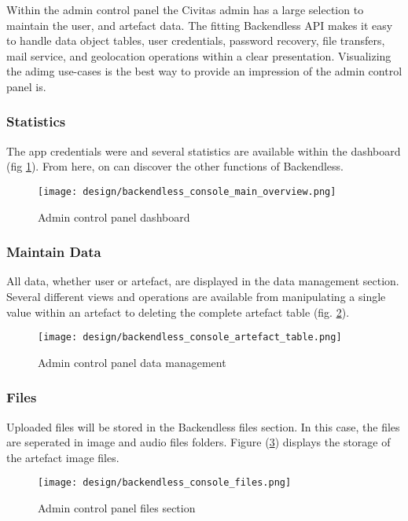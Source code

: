 Within the admin control panel the Civitas admin has a large selection to maintain the user, and artefact data. The fitting Backendless API makes it easy to handle data object tables, user credentials, password recovery, file transfers, mail service, and geolocation operations within a clear presentation. Visualizing the adimg use-cases is the best way to provide an impression of the admin control panel is.

\subsubsection*{Statistics}
The app credentials were and several statistics are available within the dashboard (fig \ref{fig:backendless_console_main_overview}). From here, on can discover the other functions of Backendless.

\begin{figure}[H]
	\centering \texttt{[image: design/backendless\_console\_main\_overview.png]}
	\caption{Admin control panel dashboard}
	\label{fig:backendless_console_main_overview}
\end{figure}


\subsubsection*{Maintain Data}
All data, whether user or artefact, are displayed in the data management section. Several different views and operations are available from manipulating a single value within an artefact to deleting the complete artefact table (fig. \ref{fig:backendless_console_artefact_table}).
\begin{figure}[H]
	\centering \texttt{[image: design/backendless\_console\_artefact\_table.png]}
	\caption{Admin control panel data management}
	\label{fig:backendless_console_artefact_table}
\end{figure}

\subsubsection*{Files}
Uploaded files will be stored in the Backendless files section. In this case, the files are seperated in image and audio files folders.  Figure (\ref{fig:backendless_console_files}) displays the storage of the artefact image files. 

\begin{figure}[H]
	\centering \texttt{[image: design/backendless\_console\_files.png]}
	\caption{Admin control panel files section}
	\label{fig:backendless_console_files}
\end{figure}

